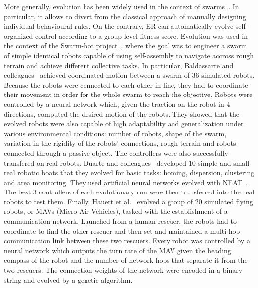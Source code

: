     More generally, evolution has been widely used in the context of swarms~\parencite{Brambilla2012, Francesca2016}. In particular, it allows to divert from the classical approach of manually designing individual behavioural rules. On the contrary, ER can automatically evolve self-organized control according to a group-level fitness score. Evolution was used in the context of the Swarm-bot project~\parencite{Mondada2005}, where the goal was to engineer a swarm of simple identical robots capable of using self-assembly to navigate accross rough terrain and achieve different collective tasks. In particular, Baldassarre and colleagues~\parencite{Baldassarre2007} achieved coordinated motion between a swarm of $36$ simulated robots. Because the robots were connected to each other in line, they had to coordinate their movement in order for the whole swarm to reach the objective. Robots were controlled by a neural network which, given the traction on the robot in $4$ directions, computed the desired motion of the robots. They showed that the evolved robots were also capable of high adaptability and generalization under various environmental conditions: number of robots, shape of the swarm, variation in the rigidity of the robots' connections, rough terrain and robots connected through a passive object. The controllers were also successfully transfered on real robots. Duarte and colleagues~\parencite{Duarte2016} developed $10$ simple and small real robotic boats that they evolved for basic tasks: homing, dispersion, clustering and area monitoring. They used artificial neural networks evolved with NEAT~\parencite{Stanley2002}. The best $3$ controllers of each evolutionary run were then transferred into the real robots to test them. Finally, Hauert et al.~\parencite{Hauert2009} evolved a group of $20$ simulated flying robots, or MAVs (Micro Air Vehicles), tasked with the establishment of a communication network. Launched from a human rescuer, the robots had to coordinate to find the other rescuer and then set and maintained a multi-hop communication link between these two rescuers. Every robot was controlled by a neural network which outputs the turn rate of the MAV given the heading compass of the robot and the number of network hops that separate it from the two rescuers. The connection weights of the network were encoded in a binary string and evolved by a genetic algorithm.

